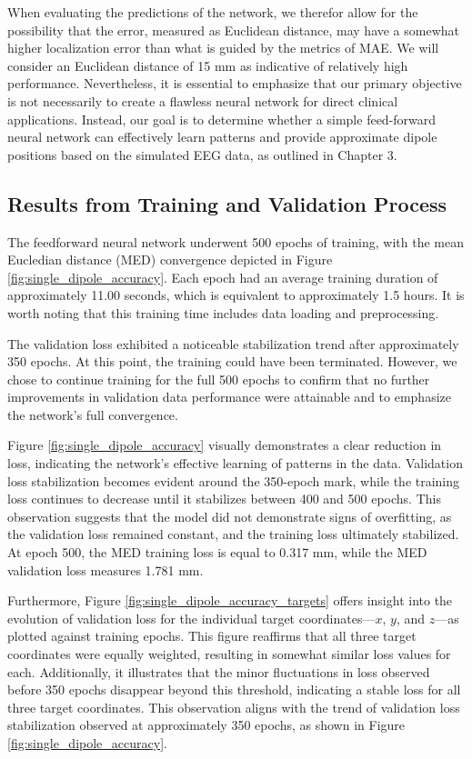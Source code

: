 \documentclass[a4paper, UKenglish, 11pt]{uiomaster}
\begin{document}
When evaluating the predictions of the network, we therefor allow for the possibility that the error, measured as Euclidean distance, may have a somewhat higher localization error than what is guided by the metrics of MAE. We will consider an Euclidean distance of 15 mm as indicative of relatively high performance. Nevertheless, it is essential to emphasize that our primary objective is not necessarily to create a flawless neural network for direct clinical applications. Instead, our goal is to determine whether a simple feed-forward neural network can effectively learn patterns and provide approximate dipole positions based on the simulated EEG data, as outlined in Chapter 3.


\subsection{Results from Training and Validation Process}
The feedforward neural network underwent 500 epochs of training, with the mean Eucledian distance (MED) convergence depicted in Figure \ref{fig:single_dipole_accuracy}. Each epoch had an average training duration of approximately 11.00 seconds, which is equivalent to approximately 1.5 hours. It is worth noting that this training time includes data loading and preprocessing.

The validation loss exhibited a noticeable stabilization trend after approximately 350 epochs. At this point, the training could have been terminated. However, we chose to continue training for the full 500 epochs to confirm that no further improvements in validation data performance were attainable and to emphasize the network's full convergence.

Figure \ref{fig:single_dipole_accuracy} visually demonstrates a clear reduction in loss, indicating the network's effective learning of patterns in the data. Validation loss stabilization becomes evident around the 350-epoch mark, while the training loss continues to decrease until it stabilizes between 400 and 500 epochs. This observation suggests that the model did not demonstrate signs of overfitting, as the validation loss remained constant, and the training loss ultimately stabilized. At epoch 500, the MED training loss is equal to 0.317 mm, while the MED validation loss measures 1.781 mm.

Furthermore, Figure \ref{fig:single_dipole_accuracy_targets} offers insight into the evolution of validation loss for the individual target coordinates—$x$, $y$, and $z$—as plotted against training epochs. This figure reaffirms that all three target coordinates were equally weighted, resulting in somewhat similar loss values for each. Additionally, it illustrates that the minor fluctuations in loss observed before 350 epochs disappear beyond this threshold, indicating a stable loss for all three target coordinates. This observation aligns with the trend of validation loss stabilization observed at approximately 350 epochs, as shown in Figure \ref{fig:single_dipole_accuracy}.
\end{document}
